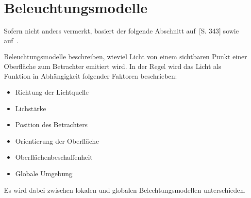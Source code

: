 
\section{Beleuchtungsmodelle}
\label{sec:illumination_models}

Sofern nicht anders vermerkt, basiert der folgende Abschnitt auf~\cite{whitted_improved_1980}[S. 343] sowie auf~\cite{hughes_computer_2013}.

Beleuchtungsmodelle beschreiben, wieviel Licht von einem sichtbaren Punkt einer Oberfläche zum Betrachter emitiert wird. In der Regel wird das Licht als Funktion in Abhängigkeit folgender Faktoren beschrieben:
\begin{itemize}
    \item Richtung der Lichtquelle \item Lichstärke
    \item Position des Betrachters
    \item Orientierung der Oberfläche
    \item Oberflächenbeschaffenheit
    \item Globale Umgebung
\end{itemize}

Es wird dabei zwischen lokalen und globalen Belechtungsmodellen unterschieden.




